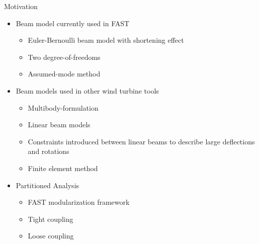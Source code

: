 \documentclass[xcolor=cmyk]{beamer}
\begin{document}
\begin{frame}{Motivation}
  \begin{itemize}
    \item
    Beam model currently used in FAST
    \begin{itemize}
      \item
      Euler-Bernoulli beam model with shortening effect
      \item
      Two degree-of-freedoms
      \item
      Assumed-mode method
    \end{itemize}
    \item
    Beam models used in other wind turbine tools
    \begin{itemize}
        \item
        Multibody-formulation
        \item
        Linear beam models
        \item
        Constraints introduced between linear beams to describe large deflections and rotations
        \item
        Finite element method
    \end{itemize}
    \item
    Partitioned Analysis
    \begin{itemize}
        \item FAST modularization framework
        \item Tight coupling
        \item Loose coupling
    \end{itemize}
  \end{itemize}
\end{frame}
\end{document}
